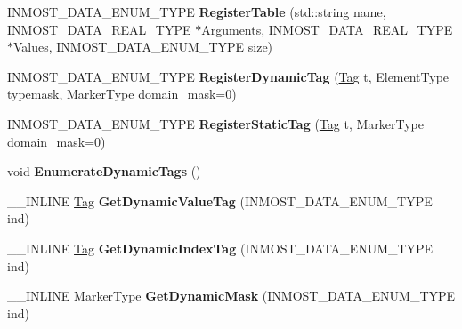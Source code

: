 \begin{DoxyCompactItemize}
\item 
\hypertarget{classINMOST_1_1Automatizator_a8421c743a56202b07b5ec567cddd7a27}{I\-N\-M\-O\-S\-T\-\_\-\-D\-A\-T\-A\-\_\-\-E\-N\-U\-M\-\_\-\-T\-Y\-P\-E {\bfseries Register\-Table} (std\-::string name, I\-N\-M\-O\-S\-T\-\_\-\-D\-A\-T\-A\-\_\-\-R\-E\-A\-L\-\_\-\-T\-Y\-P\-E $\ast$Arguments, I\-N\-M\-O\-S\-T\-\_\-\-D\-A\-T\-A\-\_\-\-R\-E\-A\-L\-\_\-\-T\-Y\-P\-E $\ast$Values, I\-N\-M\-O\-S\-T\-\_\-\-D\-A\-T\-A\-\_\-\-E\-N\-U\-M\-\_\-\-T\-Y\-P\-E size)}\label{classINMOST_1_1Automatizator_a8421c743a56202b07b5ec567cddd7a27}

\item 
\hypertarget{classINMOST_1_1Automatizator_a55d0b03edcbba30b953cb31a8f83cd1b}{I\-N\-M\-O\-S\-T\-\_\-\-D\-A\-T\-A\-\_\-\-E\-N\-U\-M\-\_\-\-T\-Y\-P\-E {\bfseries Register\-Dynamic\-Tag} (\hyperlink{classINMOST_1_1Tag}{Tag} t, Element\-Type typemask, Marker\-Type domain\-\_\-mask=0)}\label{classINMOST_1_1Automatizator_a55d0b03edcbba30b953cb31a8f83cd1b}

\item 
\hypertarget{classINMOST_1_1Automatizator_a5436e1091d87f9afe737299833fda99e}{I\-N\-M\-O\-S\-T\-\_\-\-D\-A\-T\-A\-\_\-\-E\-N\-U\-M\-\_\-\-T\-Y\-P\-E {\bfseries Register\-Static\-Tag} (\hyperlink{classINMOST_1_1Tag}{Tag} t, Marker\-Type domain\-\_\-mask=0)}\label{classINMOST_1_1Automatizator_a5436e1091d87f9afe737299833fda99e}

\item 
\hypertarget{classINMOST_1_1Automatizator_a664b648b1d36633a208fa777e97fba62}{void {\bfseries Enumerate\-Dynamic\-Tags} ()}\label{classINMOST_1_1Automatizator_a664b648b1d36633a208fa777e97fba62}

\item 
\hypertarget{classINMOST_1_1Automatizator_a7fc404b01b46043c1721319df44935c1}{\-\_\-\-\_\-\-I\-N\-L\-I\-N\-E \hyperlink{classINMOST_1_1Tag}{Tag} {\bfseries Get\-Dynamic\-Value\-Tag} (I\-N\-M\-O\-S\-T\-\_\-\-D\-A\-T\-A\-\_\-\-E\-N\-U\-M\-\_\-\-T\-Y\-P\-E ind)}\label{classINMOST_1_1Automatizator_a7fc404b01b46043c1721319df44935c1}

\item 
\hypertarget{classINMOST_1_1Automatizator_a29ee1b26035909f21fbc8e9142f8c66e}{\-\_\-\-\_\-\-I\-N\-L\-I\-N\-E \hyperlink{classINMOST_1_1Tag}{Tag} {\bfseries Get\-Dynamic\-Index\-Tag} (I\-N\-M\-O\-S\-T\-\_\-\-D\-A\-T\-A\-\_\-\-E\-N\-U\-M\-\_\-\-T\-Y\-P\-E ind)}\label{classINMOST_1_1Automatizator_a29ee1b26035909f21fbc8e9142f8c66e}

\item 
\hypertarget{classINMOST_1_1Automatizator_aa345acdac952457bdfcd5364d5e1561f}{\-\_\-\-\_\-\-I\-N\-L\-I\-N\-E Marker\-Type {\bfseries Get\-Dynamic\-Mask} (I\-N\-M\-O\-S\-T\-\_\-\-D\-A\-T\-A\-\_\-\-E\-N\-U\-M\-\_\-\-T\-Y\-P\-E ind)}\label{classINMOST_1_1Automatizator_aa345acdac952457bdfcd5364d5e1561f}


\end{DoxyCompactItemize}

